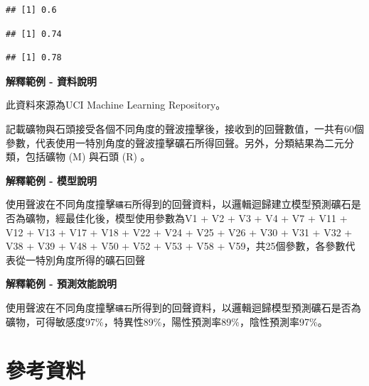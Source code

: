 \documentclass[
]{book}
\newenvironment{Shaded}{\begin{snugshade}}{\end{snugshade}}
\newcommand{\KeywordTok}[1]{\textcolor[rgb]{0.13,0.29,0.53}{\textbf{#1}}}
\newcommand{\NormalTok}[1]{#1}
\newcommand{\OperatorTok}[1]{\textcolor[rgb]{0.81,0.36,0.00}{\textbf{#1}}}
\begin{document}
\begin{verbatim}
## [1] 0.6
\end{verbatim}

\begin{Shaded}
\end{Shaded}

\begin{verbatim}
## [1] 0.74
\end{verbatim}

\begin{Shaded}
\end{Shaded}

\begin{verbatim}
## [1] 0.78
\end{verbatim}

\textbf{解釋範例 - 資料說明}

此資料來源為UCI Machine Learning Repository。

記載礦物與石頭接受各個不同角度的聲波撞擊後，接收到的回聲數值，一共有60個參數，代表使用一特別角度的聲波撞擊礦石所得回聲。另外，分類結果為二元分類，包括礦物 (M) 與石頭 (R) 。

\textbf{解釋範例 - 模型說明}

使用聲波在不同角度撞擊\texttt{礦石}所得到的回聲資料，以邏輯迴歸建立模型預測礦石是否為礦物，經最佳化後，模型使用參數為V1 + V2 + V3 + V4 + V7 + V11 + V12 + V13 + V17 + V18 + V22 + V24 + V25 + V26 + V30 + V31 + V32 + V38 + V39 + V48 + V50 + V52 + V53 + V58 + V59，共25個參數，各參數代表從一特別角度所得的礦石回聲

\textbf{解釋範例 - 預測效能說明}

使用聲波在不同角度撞擊\texttt{礦石}所得到的回聲資料，以邏輯迴歸模型預測礦石是否為礦物，可得敏感度97\%，特異性89\%，陽性預測率89\%，陰性預測率97\%。

\hypertarget{ux53c3ux8003ux8cc7ux6599}{%
\section{參考資料}\label{ux53c3ux8003ux8cc7ux6599}}
\end{document}
